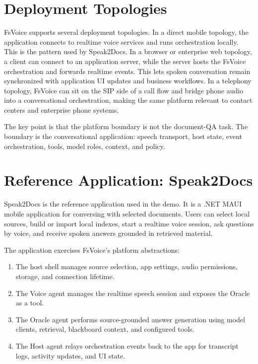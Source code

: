 \documentclass[11pt]{article}
\begin{document}
\section{Deployment Topologies}

FsVoice supports several deployment topologies. In a direct mobile topology, the application connects to realtime voice services and runs orchestration locally. This is the pattern used by Speak2Docs. In a browser or enterprise web topology, a client can connect to an application server, while the server hosts the FsVoice orchestration and forwards realtime events. This lets spoken conversation remain synchronized with application UI updates and business workflows. In a telephony topology, FsVoice can sit on the SIP side of a call flow and bridge phone audio into a conversational orchestration, making the same platform relevant to contact centers and enterprise phone systems.

The key point is that the platform boundary is not the document-QA task. The boundary is the conversational application: speech transport, host state, event orchestration, tools, model roles, context, and policy.

\section{Reference Application: Speak2Docs}

Speak2Docs is the reference application used in the demo. It is a .NET MAUI mobile application for conversing with selected documents. Users can select local sources, build or import local indexes, start a realtime voice session, ask questions by voice, and receive spoken answers grounded in retrieved material.

The application exercises FsVoice's platform abstractions:

\begin{enumerate}
  \item The host shell manages source selection, app settings, audio permissions, storage, and connection lifetime.
  \item The Voice agent manages the realtime speech session and exposes the Oracle as a tool.
  \item The Oracle agent performs source-grounded answer generation using model clients, retrieval, blackboard context, and configured tools.
  \item The Host agent relays orchestration events back to the app for transcript logs, activity updates, and UI state.
\end{enumerate}
\end{document}
